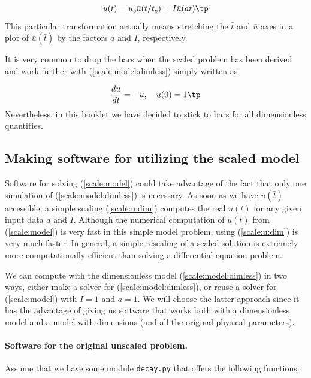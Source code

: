 \documentclass[graybox,envcountchap,sectrefs,final]{svmonodo}
\begin{document}
\begin{equation}
u(t) = u_c\bar u(t/t_c) = I\bar u(at)
\tp
\label{scale:u:dim}
\end{equation}
This particular transformation actually means stretching the $\bar t$ and
$\bar u$ axes in a plot of $\bar u(\bar t)$ by the factors $a$ and $I$,
respectively.

It is very common to drop the bars when the scaled problem has been
derived and work further with (\ref{scale:model:dimless}) simply
written as

\[
\frac{du}{dt} = -u,\quad u(0)=1
\tp
\]
Nevertheless, in this booklet we have decided to stick to bars for all
dimensionless quantities.


\subsection{Making software for utilizing the scaled model}
\label{sec:scale:prog}

Software for solving (\ref{scale:model}) could take advantage of
the fact that only one simulation of (\ref{scale:model:dimless})
is necessary. As soon as we have $\bar u(\bar t)$ accessible, a simple
scaling (\ref{scale:u:dim}) computes the real $u(t)$ for any
given input data $a$ and $I$. Although the numerical computation of
$u(t)$ from (\ref{scale:model}) is very fast in this simple model
problem, using (\ref{scale:u:dim}) is very much faster. In
general, a simple rescaling of a scaled solution is extremely more
computationally efficient than solving a differential equation
problem.

We can compute with the dimensionless model (\ref{scale:model:dimless})
in two ways, either make a solver for (\ref{scale:model:dimless}),
or reuse a solver for (\ref{scale:model}) with
$I=1$ and $a=1$.
We will choose the latter approach since it has the advantage of giving us
software that works both with a dimensionless model and a model
with dimensions (and all the original physical parameters).

\paragraph{Software for the original unscaled problem.}
Assume that we have some module \texttt{decay.py} that offers the following functions:
\end{document}

